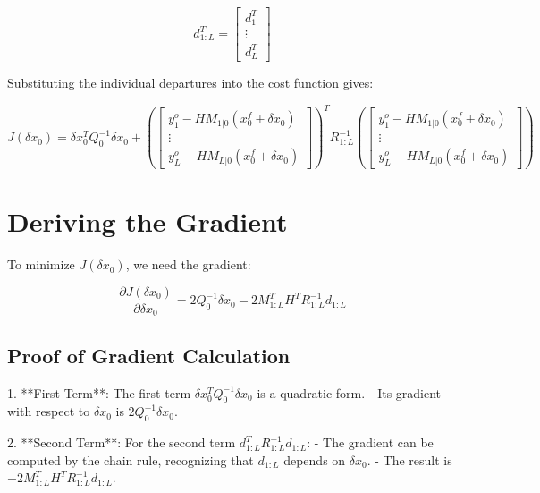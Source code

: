 \documentclass{article}
\begin{document}
\begin{equation}
d_{1:L}^T = \begin{bmatrix}
d_1^T \\
\vdots \\
d_L^T
\end{bmatrix}
\end{equation}

Substituting the individual departures into the cost function gives:

\begin{equation}
J(\delta x_0) = \delta x_0^T Q_0^{-1} \delta x_0 + \left( \begin{bmatrix}
y^o_1 - H M_{1|0}(x^f_0 + \delta x_0) \\
\vdots \\
y^o_L - H M_{L|0}(x^f_0 + \delta x_0)
\end{bmatrix} \right)^T R_{1:L}^{-1} \left( \begin{bmatrix}
y^o_1 - H M_{1|0}(x^f_0 + \delta x_0) \\
\vdots \\
y^o_L - H M_{L|0}(x^f_0 + \delta x_0)
\end{bmatrix} \right)
\end{equation}

\section{Deriving the Gradient}

To minimize \( J(\delta x_0) \), we need the gradient:

\begin{equation}
\frac{\partial J(\delta x_0)}{\partial \delta x_0} = 2 Q_0^{-1} \delta x_0 - 2 M^T_{1:L} H^T R_{1:L}^{-1} d_{1:L}
\end{equation}

\subsection*{Proof of Gradient Calculation}

1. **First Term**: The first term \( \delta x_0^T Q_0^{-1} \delta x_0 \) is a quadratic form.
   - Its gradient with respect to \( \delta x_0 \) is \( 2 Q_0^{-1} \delta x_0 \).

2. **Second Term**: For the second term \( d_{1:L}^T R_{1:L}^{-1} d_{1:L} \):
   - The gradient can be computed by the chain rule, recognizing that \( d_{1:L} \) depends on \( \delta x_0 \).
   - The result is \( -2 M^T_{1:L} H^T R_{1:L}^{-1} d_{1:L} \).
\end{document}
